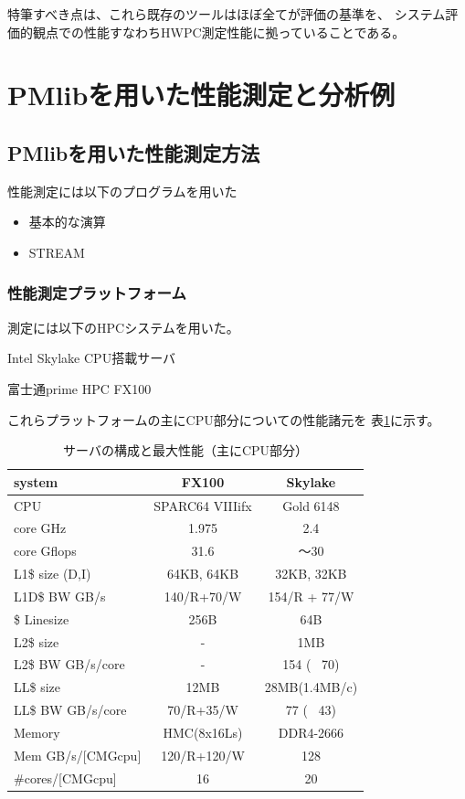 \documentclass[submit,techrep,noauthor]{ipsj}
\begin{document}
特筆すべき点は、これら既存のツールはほぼ全てが評価の基準を、
システム評価的観点での性能すなわちHWPC測定性能に拠っていることである。


\section{PMlibを用いた性能測定と分析例}

\subsection{PMlibを用いた性能測定方法}


性能測定には以下のプログラムを用いた
\begin{itemize}
\item{基本的な演算}
\item{STREAM}
\end{itemize}


\subsubsection{性能測定プラットフォーム}

測定には以下のHPCシステムを用いた。
\begin{itemize}
{
\item Intel Skylake CPU搭載サーバ
\item 富士通prime HPC FX100
}
\end{itemize}

これらプラットフォームの主にCPU部分についての性能諸元を
表\ref{tab:server-config}に示す。

\begin{table}[tb]
\scriptsize
\caption{サーバの構成と最大性能（主にCPU部分）}
\label{tab:server-config}
\footnotesize
\begin{tabular}{l|c|c} \hline
\scriptsize
system			&	FX100	&	Skylake	\\ \hline
CPU				&	SPARC64 VIIIifx	&	Gold 6148	\\ \hline
core GHz		&	1.975	&	2.4	\\ \hline
core Gflops	&	31.6	&	〜30	\\ \hline
L1\$ size (D,I)		&	64KB, 64KB	&	32KB, 32KB	\\ \hline
L1D\$ BW GB/s	&	140/R+70/W	&	154/R + 77/W	\\ \hline
\$ Linesize 	&	256B	&	64B	\\ \hline
L2\$ size		&	-	&	1MB	\\ \hline
L2\$ BW GB/s/core	&	-	&	154 ( ~70)	\\ \hline
LL\$ size		&	12MB	&	28MB(1.4MB/c)	\\ \hline
LL\$ BW GB/s/core	&	70/R+35/W	&	77 ( ~43)	\\ \hline
Memory			&	HMC(8x16Ls)	&	DDR4-2666	\\ \hline
Mem GB/s/[CMGcpu]	&	120/R+120/W	&	128	\\ \hline
\#cores/[CMGcpu]	&	16	&	20	\\ \hline
\end{tabular}
\end{table}
\end{document}
